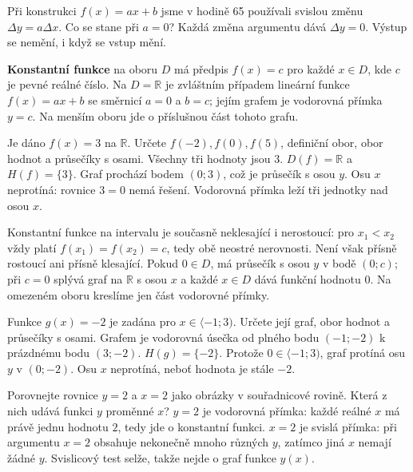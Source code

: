 \documentclass[11pt,a4paper]{article}
\begin{document}
Při konstrukci $f(x)=ax+b$ jsme v hodině 65 používali svislou změnu $\Delta y=a\Delta x$. Co se stane při $a=0$? Každá změna argumentu dává $\Delta y=0$. Výstup se nemění, i když se vstup mění.
\begin{definiceBox}
\textbf{Konstantní funkce} na oboru $D$ má předpis $f(x)=c$ pro každé $x\in D$, kde $c$ je pevné reálné číslo. Na $D=\mathbb R$ je zvláštním případem lineární funkce $f(x)=ax+b$ se směrnicí $a=0$ a $b=c$; jejím grafem je vodorovná přímka $y=c$. Na menším oboru jde o příslušnou část tohoto grafu.
\end{definiceBox}
\begin{prikladReseniBox}
Je dáno $f(x)=3$ na $\mathbb R$. Určete $f(-2),f(0),f(5)$, definiční obor, obor hodnot a průsečíky s osami.
\tcblower
Všechny tři hodnoty jsou $3$. $D(f)=\mathbb R$ a $H(f)=\{3\}$. Graf prochází bodem $(0;3)$, což je průsečík s osou $y$. Osu $x$ neprotíná: rovnice $3=0$ nemá řešení. Vodorovná přímka leží tři jednotky nad osou $x$.
\end{prikladReseniBox}
\begin{center}
\end{center}
Konstantní funkce na intervalu je současně neklesající i nerostoucí: pro $x_1<x_2$ vždy platí $f(x_1)=f(x_2)=c$, tedy obě neostré nerovnosti. Není však přísně rostoucí ani přísně klesající. Pokud $0\in D$, má průsečík s osou $y$ v bodě $(0;c)$; při $c=0$ splývá graf na $\mathbb R$ s osou $x$ a každé $x\in D$ dává funkční hodnotu $0$. Na omezeném oboru kreslíme jen část vodorovné přímky.
\begin{prikladReseniBox}
Funkce $g(x)=-2$ je zadána pro $x\in\langle-1;3)$. Určete její graf, obor hodnot a průsečíky s osami.
\tcblower
Grafem je vodorovná úsečka od plného bodu $(-1;-2)$ k prázdnému bodu $(3;-2)$. $H(g)=\{-2\}$. Protože $0\in\langle-1;3)$, graf protíná osu $y$ v $(0;-2)$. Osu $x$ neprotíná, neboť hodnota je stále $-2$.
\end{prikladReseniBox}
\begin{prikladReseniBox}
Porovnejte rovnice $y=2$ a $x=2$ jako obrázky v souřadnicové rovině. Která z nich udává funkci $y$ proměnné $x$?
\tcblower
$y=2$ je vodorovná přímka: každé reálné $x$ má právě jednu hodnotu $2$, tedy jde o konstantní funkci. $x=2$ je svislá přímka: při argumentu $x=2$ obsahuje nekonečně mnoho různých $y$, zatímco jiná $x$ nemají žádné $y$. Svislicový test selže, takže nejde o graf funkce $y(x)$.
\end{prikladReseniBox}
\end{document}
